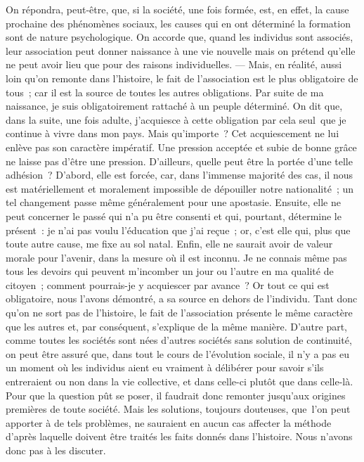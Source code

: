 \documentclass[french,twoside]{book} %
\begin{document}
On répondra, peut-être, que, si la société, une fois formée, est, en effet, la cause prochaine des phénomènes sociaux, les causes qui en ont déterminé la formation sont de nature psychologique. On accorde que, quand les individus sont associés, leur association peut donner naissance à une vie nouvelle mais on prétend qu’elle ne peut avoir lieu que pour des raisons individuelles. — Mais, en réalité, aussi loin qu’on remonte dans l’histoire, le fait de l’association est le plus obligatoire de tous ; car il est la source de toutes les autres obligations. Par suite de ma naissance, je suis obligatoirement rattaché à un peuple déterminé. On dit que, dans la suite, une fois adulte, j’acquiesce à cette obligation par cela seul que je continue à vivre dans mon pays. Mais qu’importe ? Cet acquiescement ne lui enlève pas son caractère impératif. Une pression acceptée et subie de bonne grâce ne laisse pas d’être une pression. D’ailleurs, quelle peut être la portée d’une telle adhésion ? D’abord, elle est forcée, car, dans l’immense majorité des cas, il nous est matériellement et moralement impossible de dépouiller notre nationalité ; un tel changement passe même généralement pour une apostasie. Ensuite, elle ne peut concerner le passé qui n’a pu être consenti et qui, pourtant, détermine le présent : je n’ai pas voulu l’éducation que j’ai reçue ; or, c’est elle qui, plus que toute autre cause, me fixe au sol natal. Enfin, elle ne saurait avoir de valeur morale pour l’avenir, dans la mesure où il est inconnu. Je ne connais même pas tous les devoirs qui peuvent m’incomber un jour ou l’autre en ma qualité de citoyen ; comment pourrais-je y acquiescer par avance ? Or tout ce qui est obligatoire, nous l’avons démontré, a sa source en dehors de l’individu. Tant donc qu’on ne sort pas de l’histoire, le fait de l’association présente le même caractère que les autres et, par conséquent, s’explique de la même manière. D’autre part, comme toutes les sociétés sont nées d’autres sociétés sans solution de continuité, on peut être assuré que, dans tout le cours de l’évolution sociale, il n’y a pas eu un moment où les individus aient eu vraiment à délibérer pour savoir s’ils entreraient ou non dans la vie collective, et dans celle-ci plutôt que dans celle-là. Pour que la question pût se poser, il faudrait donc remonter jusqu’aux origines premières de toute société. Mais les solutions, toujours douteuses, que l’on peut apporter à de tels problèmes, ne sauraient en aucun cas affecter la méthode d’après laquelle doivent être traités les faits donnés dans l’histoire. Nous n’avons donc pas à les discuter.\par
\end{document}
